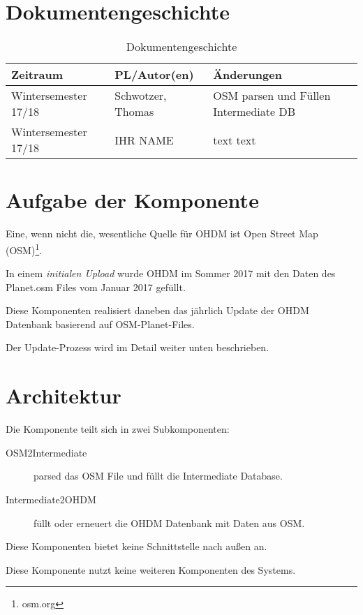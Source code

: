 \section{Dokumentengeschichte}
\begin{table}[h]
 \begin{tabular}{|l|l|p{4cm}|}
 \hline
 Zeitraum & PL/Autor(en) & Änderungen \\
 \hline
 Wintersemester 17/18 & Schwotzer, Thomas & 
OSM parsen und Füllen Inter\-mediate DB
   \\
 \hline
 Wintersemester 17/18 & IHR NAME & 
text \newline 
text \newline 
 
  \\
 \hline
 \end{tabular}
 \caption{Dokumentengeschichte}
 \end{table}

\section{Aufgabe der Komponente}
Eine, wenn nicht die, wesentliche Quelle für OHDM ist Open Street 
Map (OSM)\footnote{osm.org}.

In einem {\it initialen Upload} wurde OHDM im Sommer 2017 mit
den Daten des Planet.osm Files vom Januar 2017 gefüllt.

Diese Komponenten realisiert daneben das jährlich Update der
OHDM Datenbank basierend auf OSM-Planet-Files.

Der Update-Prozess wird im Detail weiter unten beschrieben.

\section{Architektur}
Die Komponente teilt sich in zwei Subkomponenten:

\begin{description}
\item[OSM2Intermediate] 
parsed das OSM File und füllt die
Intermediate Database.

\item[Intermediate2OHDM] füllt oder erneuert die OHDM Datenbank 
mit Daten aus OSM.

\end{description}

Diese Komponenten bietet keine Schnittstelle nach außen an.

Diese Komponente nutzt keine weiteren Komponenten des Systems.

